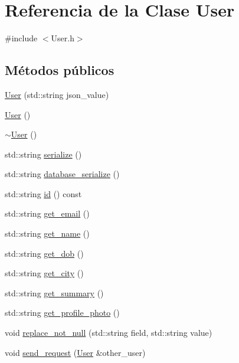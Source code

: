 \hypertarget{classUser}{}\section{Referencia de la Clase User}
\label{classUser}


{\ttfamily \#include $<$User.\+h$>$}

\subsection*{Métodos públicos}
\begin{DoxyCompactItemize}
\item 
\hyperlink{classUser_a39b6626888c80680166832d96a8ac4c7}{User} (std\+::string json\+\_\+value)
\item 
\hyperlink{classUser_a4a0137053e591fbb79d9057dd7d2283d}{User} ()
\item 
\hyperlink{classUser_ac00b72ad64eb4149f7b21b9f5468c2b2}{$\sim$\+User} ()
\item 
std\+::string \hyperlink{classUser_a3394f9749a9e0c807ff34d148d9f835a}{serialize} ()
\item 
std\+::string \hyperlink{classUser_a027b5483be61adf2d2b18c06e0f76409}{database\+\_\+serialize} ()
\item 
std\+::string \hyperlink{classUser_ac140c8f3831f0c137a0356b5c5d1ac0c}{id} () const
\item 
std\+::string \hyperlink{classUser_afced0a5a8d577143c88f9ec8d36e0510}{get\+\_\+email} ()
\item 
std\+::string \hyperlink{classUser_a86c6040cbc76ac12c7f154b054bd1035}{get\+\_\+name} ()
\item 
std\+::string \hyperlink{classUser_a6f128d38b5cf38e1345b109f7264624f}{get\+\_\+dob} ()
\item 
std\+::string \hyperlink{classUser_a0b1c6d729cb6260557efcc614019ad3d}{get\+\_\+city} ()
\item 
std\+::string \hyperlink{classUser_abd12a463644dad79711a99e9b4ca5f81}{get\+\_\+summary} ()
\item 
std\+::string \hyperlink{classUser_aca8fcd8329ceba292fc4b762962f514a}{get\+\_\+profile\+\_\+photo} ()
\item 
void \hyperlink{classUser_afe3e0fa5e2a7189e2ec94cb126cb1ee0}{replace\+\_\+not\+\_\+null} (std\+::string field, std\+::string value)
\item 
void \hyperlink{classUser_a4452f9cee8e5928ca3feb248ddf61ed5}{send\+\_\+request} (\hyperlink{classUser}{User} \&other\+\_\+user)
\item 

\end{DoxyCompactItemize}
